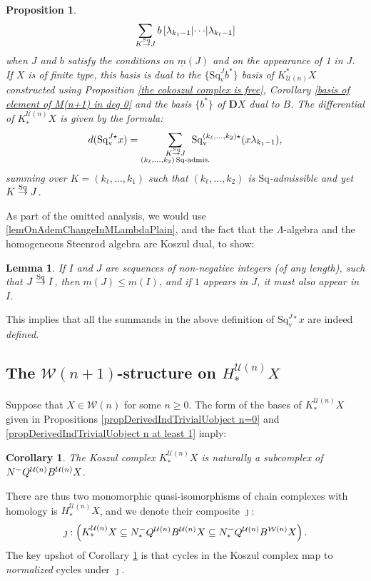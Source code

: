 \documentclass[11pt]{amsart} \renewcommand{\baselinestretch}{1.2}
\theoremstyle{plain}
\newtheorem{lem}[thm]{Lemma}
\newtheorem{prop}[thm]{Proposition}
\newtheorem{cor}[thm]{Corollary}
\numberwithin{equation}{section} %
\theoremstyle{plain}
\newtheorem{lem}[thm]{Lemma}
\newtheorem{prop}[thm]{Proposition}
\newtheorem{cor}[thm]{Corollary}
\numberwithin{equation}{chapter} %
\newcommand{\calU}{\mathcal{U}}
\newcommand{\calw}{\mathcal{W}}
\newcommand{\minDimSq}{\underline{m}}
\newcommand{\produces}[3]{#3:#1\sim #2}
\renewcommand{\produces}[3]{#1\rightarrow_{#3} #2}%
\renewcommand{\produces}[3]{#1\overset{\smash{#3}}{\rightarrow} #2}%
\newcommand{\Nop}{N^{\smash{-}}}
\newcommand{\Sq}{\mathrm{Sq}}
\newcommand{\dver}{_\mathrm{v}}
\newcommand{\Sqv}{\mathrm{Sq}\dver}
\newcommand{\Sqvstar}[1]{\mathrm{Sq}\dver^{#1\star}}
\newcommand{\dual}{\mathbf{D}}
\newcommand{\SubsectionOrSection}[1]{\subsection{#1}}
\begin{document}
\begin{Koszul complexes}
\begin{prop}
\[\sum_{\produces{K}{J}{\Sq}}b\left[\lambda_{k_1-1} \middle|\cdots\middle|\lambda_{k_\ell-1} \right]\]
when $J$ and $b$ satisfy the conditions on $\minDimSq(J)$ and on the appearance of 1 in $J$.
If $X$ is  of finite type, this basis is dual to the $\{\Sqv^Jb^*\}$ basis of $K^*_{\calU(n)}X$   constructed using Proposition \ref{the cokoszul complex is free}, Corollary \ref{basis of element of M(n+1) in deg 0} and the basis $\{b^*\}$  of $\dual X$ dual to $B$. The differential of $K^{\calU(n)}_*X$ is given by the formula:
\[d(\Sqvstar{J}x)=\sum_{ \substack{\produces{K}{J}{\Sq}\\(k_{\ell},\ldots,k_2){\,\Sq\textup{-admis.}}}}\!\!\!\!\!\!\!\!\!\!\!\! \Sqvstar{(k_{\ell},\ldots,k_2)}(x\lambda_{k_1-1}),\]
summing over $K=(k_{\ell},\ldots,k_1)$ such that $(k_{\ell},\ldots,k_2)$ is $\Sq$-admissible %
and yet $\produces{K}{J}{\Sq}$.
\end{prop}
\noindent As part of the omitted analysis, we would use \ref{lemOnAdemChangeInMLambdaPlain}, and the fact that the $\Lambda$-algebra and the homogeneous Steenrod algebra are Koszul dual, to show:
\begin{lem}
If $I$ and $J$ are sequences of non-negative integers (of any length), such that $\produces{J}{I}{\Sq}$, then $\minDimSq(J)\leq\minDimSq(I)$, and if $1$ appears in $J$, it must also appear in $I$.
\end{lem}
\noindent This implies that all the summands in the above definition of $\Sqvstar{J}x$ are indeed \emph{defined}.
\SubsectionOrSection{The $\calw(n+1)$-structure on $H_*^{\calU(n)}X$}\label{section on structure on homology of koszul cx}
Suppose that $X\in\calw(n)$ for some $n\geq0$. The form of the bases of $K_*^{\calU(n)}X$ given in Propositions \ref{propDerivedIndTrivialUobject n=0} and \ref{propDerivedIndTrivialUobject n at least 1} imply:
\begin{cor}
\label{cycles in the Koszul complex are normalized cycles}
The Koszul complex $K_*^{\calU(n)}X$ is naturally a subcomplex of $\Nop Q^{\calU(n)}B^{\calU(n)}X$.
\end{cor}
\noindent  There are  thus two monomorphic quasi-isomorphisms of chain complexes with homology is $H_*^{\calU(n)}X$, and we denote their composite $\jmath$:
\[\jmath:\left(K_*^{\calU(n)}X\subseteq \Nop_*Q^{\calU(n)}B^{\calU(n)}X\subseteq \Nop_*Q^{\calU(n)}B^{\calw(n)}X\right).\]
The key upshot of Corollary \ref{cycles in the Koszul complex are normalized cycles} is that cycles in the Koszul complex map to \emph{normalized} cycles under $\jmath$.


\end{Koszul complexes}
\end{document}

